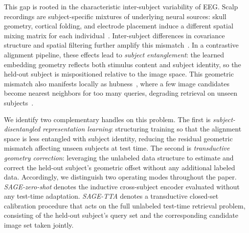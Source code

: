 \documentclass{article}
\begin{document}
This gap is rooted in the characteristic inter-subject variability of EEG. Scalp recordings are subject-specific mixtures of underlying neural sources: skull geometry, cortical folding, and electrode placement induce a different spatial mixing matrix for each individual~\cite{onton2006imaging}. Inter-subject differences in covariance structure and spatial filtering further amplify this mismatch~\cite{blankertz2008optimizing,barachant2010riemannian,samek2013transferring,haufe2014interpretation}. In a contrastive alignment pipeline, these effects lead to \emph{subject entanglement}: the learned embedding geometry reflects both stimulus content and subject identity, so the held-out subject is mispositioned relative to the image space. This geometric mismatch also manifests locally as hubness~\cite{radovanovic2010hubs,dinu2015hubness}, where a few image candidates become nearest neighbors for too many queries, degrading retrieval on unseen subjects~\cite{huang2026sattc}.

We identify two complementary handles on this problem.
The first is \emph{subject-disentangled representation learning}: structuring training so that the alignment space is less entangled with subject identity, reducing the residual geometric mismatch affecting unseen subjects at test time.
The second is \emph{transductive geometry correction}: leveraging the unlabeled data structure to estimate and correct the held-out subject's geometric offset without any additional labeled data. Accordingly, we distinguish two operating modes throughout the paper. \emph{SAGE-zero-shot} denotes the inductive cross-subject encoder evaluated without any test-time adaptation. \emph{SAGE-TTA} denotes a transductive closed-set calibration procedure that acts on the full unlabeled test-time retrieval problem, consisting of the held-out subject's query set and the corresponding candidate image set taken jointly.
\end{document}
